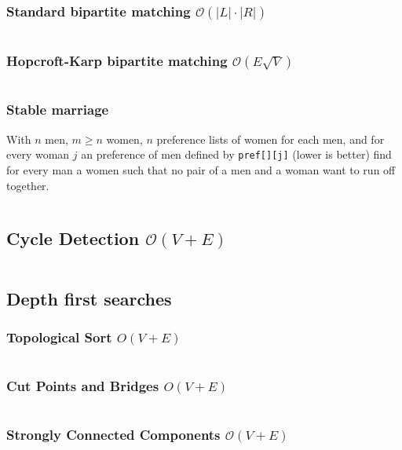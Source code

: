 \documentclass[9pt,a4paper,landscape,oneside]{amsart}
\newcommand{\mintedstyle}[2]{\inputminted{#1}{code/#2}}
\newcommand{\code}[1]{\mintedstyle{cpp}{#1}}
\begin{document}
\begin{multicols*}{3}
\begin{description}
\end{description}
\subsubsection{Standard bipartite matching $\mathcal{O}(\lvert L \rvert \cdot \lvert R \rvert)$}
\code{graphs/maxmatch.cpp}

\subsubsection{Hopcroft-Karp bipartite matching $\mathcal{O}(E \sqrt{V})$}
\label{sec:mvc}
\code{graphs/hopcroft_karp.cpp}


\subsubsection{Stable marriage}
With $n$ men, $m \geq n$ women, $n$ preference lists of women for each men, and
for every woman $j$ an preference of men defined by \texttt{pref[][j]} (lower is better)
find for every man a women such that no pair of a men and a woman want to run off together.
\code{graphs/stable.cpp}

\subsection{Cycle Detection $\mathcal{O}(V + E)$}
\code{graphs/findcycle.cpp}

\subsection{Depth first searches}

\subsubsection{Topological Sort $O(V+E)$}
\code{graphs/toposort.cpp}

\subsubsection{Cut Points and Bridges $O(V+E)$}
\code{graphs/cut_points_and_bridges.cpp}

\subsubsection{Strongly Connected Components $\mathcal{O}(V + E)$}
\code{graphs/scc.cpp}


\end{multicols*}
\end{document}
